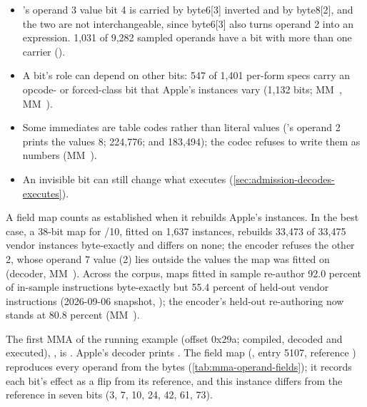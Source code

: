 \begin{itemize}
\item {}'s operand 3 value bit 4 is carried by byte6{[}3{]} inverted and by byte8{[}2{]}, and the two are not
  interchangeable, since byte6{[}3{]} also turns operand 2 into an expression. 1,031 of 9,282 sampled operands have a
  bit with more than one carrier ().
\item A bit's role can depend on other bits: 547 of 1,401 per-form specs carry an opcode- or forced-class bit that Apple's
  instances vary (1,132 bits; MM~, MM~).
\item Some immediates are table codes rather than literal values ('s operand 2 prints the values 8; 224,776; and 183,494); the codec refuses to write them as numbers (MM~).
\item An invisible bit can still change what executes (\cref{sec:admission-decodes-executes}).
\end{itemize}

A field map counts as established when it rebuilds Apple's instances. In the best case, a 38-bit map for /10, fitted on 1,637 instances, rebuilds 33,473 of 33,475 vendor instances
byte-exactly and differs on none; the encoder refuses the other 2, whose operand 7 value (2) lies outside the values
the map was fitted on (decoder, MM~). Across the corpus, maps fitted in sample re-author 92.0 percent of in-sample
instructions byte-exactly but 55.4 percent of held-out vendor instructions (2026-09-06 snapshot,
); the encoder's held-out re-authoring now stands at 80.8 percent (MM~).

The first MMA of the running example (offset 0x29a; compiled, decoded and executed), , is
. Apple's decoder prints
. The field map
(, entry 5107, reference ) reproduces every operand from the
bytes (\cref{tab:mma-operand-fields}); it records each bit's effect as a flip from its reference, and this instance differs from the reference in seven
bits (3, 7, 10, 24, 42, 61, 73).

